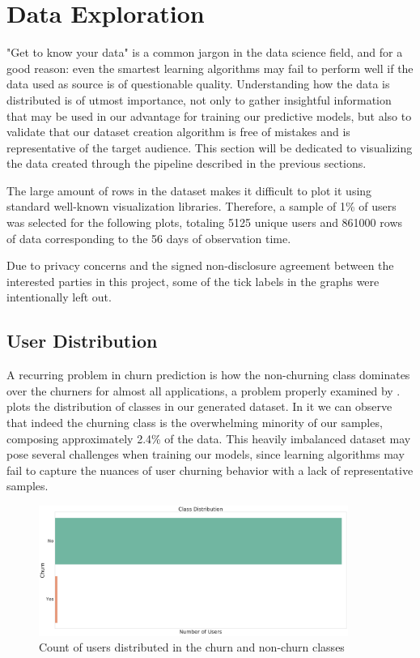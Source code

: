 \documentclass{kththesis}
\begin{document}
\section{Data Exploration}

"Get to know your data" is a common jargon in the data science field, and for a good reason: even the smartest learning algorithms may fail to perform well if the data used as source is of questionable quality. Understanding how the data is distributed is of utmost importance, not only to gather insightful information that may be used in our advantage for training our predictive models, but also to validate that our dataset creation algorithm is free of mistakes and is representative of the target audience. This section will be dedicated to visualizing the data created through the pipeline described in the previous sections.

The large amount of rows in the dataset makes it difficult to plot it using standard well-known visualization libraries. Therefore, a sample of 1\% of users was selected for the following plots, totaling 5125 unique users and 861000 rows of data corresponding to the 56 days of observation time.

Due to privacy concerns and the signed non-disclosure agreement between the interested parties in this project, some of the tick labels in the graphs were intentionally left out.

\subsection{User Distribution}

A recurring problem in churn prediction is how the non-churning class dominates over the churners for almost all applications, a problem properly examined by \citep{Burez2009}.  plots the distribution of classes in our generated dataset. In it we can observe that indeed the churning class is the overwhelming minority of our samples, composing approximately 2.4\% of the data. This heavily imbalanced dataset may pose several challenges when training our models, since learning algorithms may fail to capture the nuances of user churning behavior with a lack of representative samples.

	\begin{figure}[H]
    \centering
    \includegraphics[width=0.9\textwidth,height=0.9\textheight,keepaspectratio]{figures/class_dist.pdf}
    \caption{Count of users distributed in the churn and non-churn classes}
    \label{fig:classdist}
	\end{figure}
\end{document}
